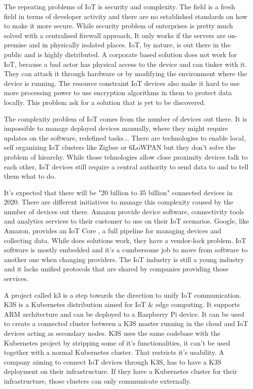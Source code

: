 The repeating problems of IoT is security and complexity. The field is a fresh field in terms of developer activity and there are no established standards on how to make it more secure. While security problem of enterprises is pretty much solved with a centralised firewall approach, It only works if the servers are on-premise and in physically isolated places. IoT, by nature, is out there in the public and is highly distributed. A corporate based solution does not work for IoT, because a bad actor has physical access to the device and can tinker with it. They can attack it through hardware or by modifying the environment where the device is running. The resource constraint IoT devices also make it hard to use more processing power to use encryption algorithms in them to protect data locally. This problem ask for a solution that is yet to be discovered.

The complexity problem of IoT comes from the number of devices out there. It is impossible to manage deployed devices manually, where they might require updates on the software, redefined tasks... There are technologies to enable local, self organizing IoT clusters like Zigbee or 6LoWPAN but they don't solve the problem of hiearchy. While those tehnologies allow close proximity devices talk to each other, IoT devices still require a central authority to send data to and to tell them what to do.
\fi

It's expected that there will be "20 billion to 35 billion" \cite{unikernels-improve} connected devices in 2020. There are different initiatives to manage this complexity caused by the number of devices out there. Amazon provide device software, connectivity tools and analytics services to their customer to use on their IoT scenarios. Google, like Amazon, provides an IoT Core , a full pipeline for managing devices and collecting data. While does solutions work, they have a vendor-lock problem. IoT software is mostly embedded and it's a cumbersome job to move from software to another one when changing providers. The IoT industry is still a young industry and it lacks unified protocols that are shared by companies providing those services.

A project called k3 \cite{k3s} is a step towards the direction to unify IoT communication. K3S is a Kubernetes distribution aimed for IoT \& edge computing. It supports ARM architecture and can be deployed to a Raspberry Pi device. It can be used to create a connected cluster between a K3S master running in the cloud and IoT devices acting as secondary nodes. K3S uses the same codebase with the Kubernetes project by stripping some of it's functionalities, it can't be used together with a normal Kubernetes cluster. That restricts it's usability. A company aiming to connect IoT devices through K3S, has to have a K3S deployment on their infrastructure. If they have a Kubernetes cluster for their infrastructure, those clusters can only communicate externally.

